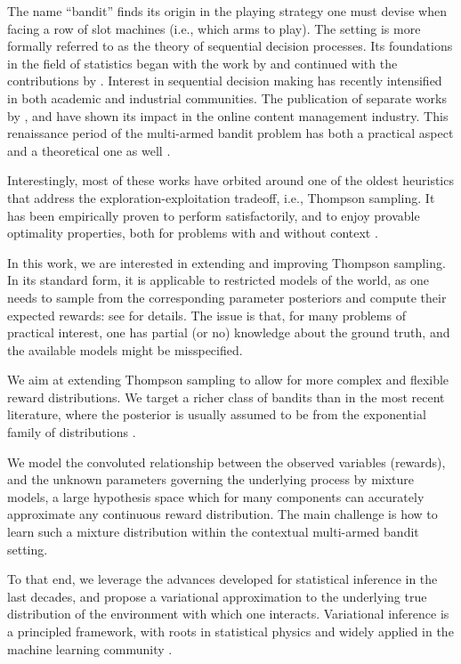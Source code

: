 \documentclass{article}
\newcommand{\ie}{i.e., }
\begin{document}
The name ``bandit'' finds its origin in the playing strategy one must devise when facing a row of slot machines (\ie which arms to play). The setting is more formally referred to as the theory of sequential decision processes. Its foundations in the field of statistics began with the work by \citet{j-Thompson1933,j-Thompson1935} and continued with the contributions by \citet{j-Robbins1952}. Interest in sequential decision making has recently intensified in both academic and industrial communities. The publication of separate works by \citet{ic-Chapelle2011}, and \citet{j-Scott2015} have shown its impact in the online content management industry. This renaissance period of the multi-armed bandit problem has both a practical aspect \cite{j-Li2010} and a theoretical one as well \cite{j-Scott2010,j-Agrawal2011,ip-Maillard2011}.

Interestingly, most of these works have orbited around one of the oldest heuristics that address the exploration-exploitation tradeoff, \ie Thompson sampling. It has been empirically proven to perform satisfactorily, and to enjoy provable optimality properties, both for problems with and without context \cite{j-Agrawal2012,j-Agrawal2012a,ic-Korda2013,j-Russo2014,j-Russo2016}.

In this work, we are interested in extending and improving Thompson sampling. In its standard form, it is applicable to restricted models of the world, as one needs to sample from the corresponding parameter posteriors and compute their expected rewards: see \cite{j-Scott2010} for details. The issue is that, for many problems of practical interest, one has partial (or no) knowledge about the ground truth, and the available models might be misspecified. 

We aim at extending Thompson sampling to allow for more complex and flexible reward distributions. We target a richer class of bandits than in the most recent literature, where the posterior is usually assumed to be from the exponential family of distributions \cite{ic-Korda2013}.

We model the convoluted relationship between the observed variables (rewards), and the unknown parameters governing the underlying process by mixture models, a large hypothesis space which for many components can accurately approximate any continuous reward distribution. The main challenge is how to learn such a mixture distribution within the contextual multi-armed bandit setting.

To that end, we leverage the advances developed for statistical inference in the last decades, and propose a variational approximation to the underlying true distribution of the environment with which one interacts. Variational inference is a principled framework, with roots in statistical physics and widely applied in the machine learning community \cite{b-Bishop2006}.
\end{document}
